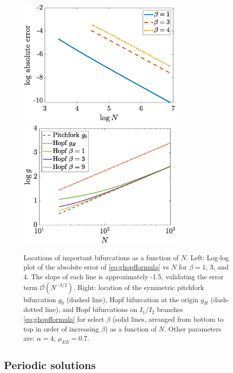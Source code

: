 \documentclass[reqno]{siamonline190516}
\begin{document}
\begin{figure}
    \centering
    \includegraphics[width=8.25cm]{Hopfapproxerrorsemilog.eps} \hspace{-0.5cm}
    \includegraphics[width=8.25cm]{HopflogNvsgsemilog.eps}
    \caption{Locations of important bifurcations as a function of $N$. Left: Log-log plot of the absolute error of  \cref{eq:ghopfformula} vs $N$ for $\beta = 1$, 3, and 4. The slope of each line is approximately -1.5, validating the error term $\mathcal{O}\left( N^{-3/2} \right)$. Right: location of the symmetric pitchfork bifurcation $g_0$ (dashed line), Hopf bifurcation at the origin $g_H$ (dash-dotted line), and Hopf bifurcations on $I_1/I_2$ branches \cref{eq:ghopfformula} for select $\beta$ (solid lines, arranged from bottom to top in order of increasing $\beta$) as a function of $N$. Other parameters are: $\alpha = 4$, $\mu_{EE}= 0.7$. }
    \label{fig:Hopfplots}
\end{figure}


\subsection{Periodic solutions}\label{sec:periodic}
\end{document}
